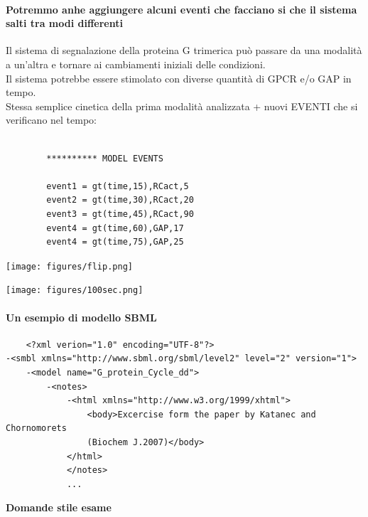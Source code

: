 \documentclass{article}
\begin{document}
\paragraph{Potremmo anhe aggiungere alcuni eventi che facciano si che il sistema salti tra modi differenti}
Il sistema di segnalazione della proteina G trimerica può passare da una modalità a
un'altra e tornare ai cambiamenti iniziali delle condizioni.\\
Il sistema potrebbe essere stimolato con diverse quantità di GPCR e/o GAP in tempo.\\
Stessa semplice cinetica della prima modalità analizzata + nuovi EVENTI che si verificano nel tempo:\\
\begin{minipage}[c]{.5\textwidth}
    \begin{verbatim}

        ********** MODEL EVENTS

        event1 = gt(time,15),RCact,5
        event2 = gt(time,30),RCact,20
        event3 = gt(time,45),RCact,90
        event4 = gt(time,60),GAP,17
        event4 = gt(time,75),GAP,25

    \end{verbatim}
\end{minipage}%
\begin{minipage}[c]{.5\textwidth}
    \centering
    \texttt{[image: figures/flip.png]}
\end{minipage}
\begin{center}
    \texttt{[image: figures/100sec.png]}
\end{center}
\paragraph{Un esempio di modello SBML}
\begin{verbatim}
    <?xml verion="1.0" encoding="UTF-8"?>
-<smbl xmlns="http://www.sbml.org/sbml/level2" level="2" version="1">
    -<model name="G_protein_Cycle_dd">
        -<notes>
            -<html xmlns="http://www.w3.org/1999/xhtml">
                <body>Excercise form the paper by Katanec and Chornomorets
                (Biochem J.2007)</body>
            </html>
            </notes>
            ...
\end{verbatim}



\begin{titlepage}
    \begin{center}
        \vspace*{1cm}
        \LARGE
        \textbf{Domande stile esame}

    \end{center}
\end{titlepage}
\end{document}
